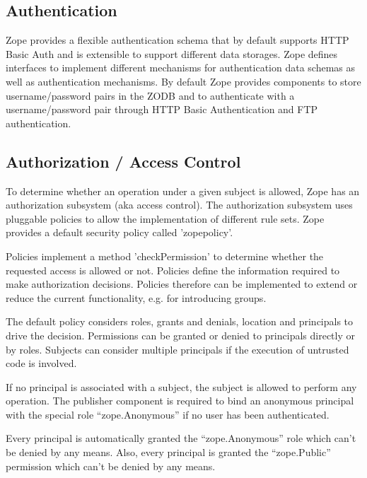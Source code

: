 \documentclass[12pt,english]{scrbook}
\begin{document}



\subsection{Authentication}

Zope provides a flexible authentication schema that by default supports HTTP
Basic Auth and is extensible to support different data
storages. Zope defines interfaces to implement different mechanisms for
authentication data schemas as well as authentication mechanisms. By default
Zope provides components to store username/password pairs in the ZODB and to
authenticate with a username/password pair through HTTP Basic Authentication
and FTP authentication.





\subsection{Authorization / Access Control}

To determine whether an operation under a given subject is allowed, Zope has an
authorization subsystem (aka access control). The authorization subsystem uses
pluggable policies to allow the implementation of different rule sets. Zope
provides a default security policy called 'zopepolicy'.

Policies implement a method 'checkPermission' to determine whether the
requested access is allowed or not. Policies define the information required to
make authorization decisions.  Policies therefore can be implemented to extend
or reduce the current functionality, e.g. for introducing groups.

The default policy considers roles, grants and denials, location and principals
to drive the decision. Permissions can be granted or denied to principals
directly or by roles.  Subjects can consider multiple principals if the
execution of untrusted code is involved.

If no principal is associated with a subject, the subject is allowed to perform
any operation. The publisher component is required to bind an anonymous
principal with the special role ``zope.Anonymous'' if no user has been
authenticated.

Every principal is automatically granted the ``zope.Anonymous'' role which can't be
denied by any means. Also, every principal is granted the ``zope.Public''
permission which can't be denied by any means.
\end{document}
